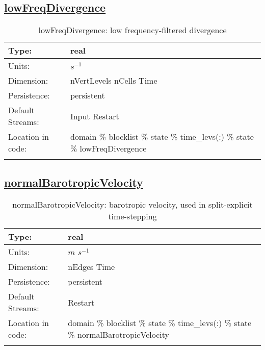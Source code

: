 \subsection[lowFreqDivergence]{\hyperref[sec:var_tab_state]{lowFreqDivergence}}
\label{subsec:var_sec_state_lowFreqDivergence}
\begin{center}
\begin{longtable}{| p{2.0in} | p{4.0in} |}
        \hline 
        Type: & real \\
        \hline 
        Units: & $s^{-1}$ \\
        \hline 
        Dimension: & nVertLevels nCells Time \\
        \hline 
        Persistence: & persistent \\
        \hline 
		 Default Streams: & Input Restart  \\
        \hline 
		 Location in code: & domain \% blocklist \% state \% time\_levs(:) \% state \% lowFreqDivergence \\
		 \hline 
    \caption{lowFreqDivergence: low frequency-filtered divergence}
\end{longtable}
\end{center}
\subsection[normalBarotropicVelocity]{\hyperref[sec:var_tab_state]{normalBarotropicVelocity}}
\label{subsec:var_sec_state_normalBarotropicVelocity}
\begin{center}
\begin{longtable}{| p{2.0in} | p{4.0in} |}
        \hline 
        Type: & real \\
        \hline 
        Units: & $m$ $s^{-1}$ \\
        \hline 
        Dimension: & nEdges Time \\
        \hline 
        Persistence: & persistent \\
        \hline 
		 Default Streams: & Restart  \\
        \hline 
		 Location in code: & domain \% blocklist \% state \% time\_levs(:) \% state \% normalBarotropicVelocity \\
		 \hline 
    \caption{normalBarotropicVelocity: barotropic velocity, used in split-explicit time-stepping}
\end{longtable}
\end{center}
